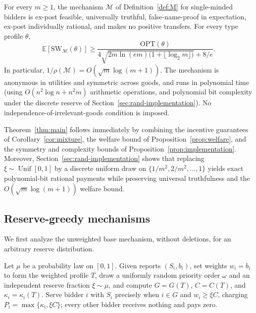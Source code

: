 \documentclass[format=acmsmall, review=false]{acmart}
\newcommand{\E}{\mathbb{E}}
\newcommand{\OPT}{\mathrm{OPT}}
\newcommand{\SW}{\mathrm{SW}}
\theoremstyle{acmdefinition}%
\begin{document}
\begin{theorem}\label{thm:main}
For every \(m\ge1\), the mechanism \(\mathcal M\) of
Definition~\ref{def:M} for single-minded bidders is ex-post
feasible, universally truthful, false-name-proof in expectation,
ex-post individually rational, and makes no positive transfers.
For every type profile \(\theta\),
\[
\E[\SW_{\mathcal M}(\theta)]
\ge
\frac{\OPT(\theta)}{
4\sqrt{2m\ln(em)\bigl(1+\lfloor\log_2m\rfloor\bigr)}+8/e}.
\]
In particular, \(1/\rho(\mathcal M)=O(\sqrt m\log(m+1))\).
The mechanism is anonymous in utilities and symmetric across
goods, and runs in polynomial time (using \(O(n^2\log n+n^2m)\)
arithmetic operations, and polynomial bit complexity under the
discrete reserve of Section~\ref{sec:rand-implementation}). No
independence-of-irrelevant-goods condition is imposed.
\end{theorem}

Theorem~\ref{thm:main} follows immediately by combining the
incentive guarantees of Corollary~\ref{cor:mixture}, the welfare
bound of Proposition~\ref{prop:welfare}, and the symmetry and
complexity bounds of Proposition~\ref{prop:implementation}.
Moreover, Section~\ref{sec:rand-implementation} shows that
replacing \(\xi\sim\operatorname{Unif}[0,1]\) by a discrete
uniform draw on \(\{1/m^2,2/m^2,\ldots,1\}\) yields exact
polynomial-bit rational payments while preserving universal
truthfulness and the \(O(\sqrt m\log(m+1))\) welfare bound.

\subsection{Reserve-greedy mechanisms}
\label{sec:rand-reserve}

We first analyze the unweighted base mechanism, without deletions,
for an arbitrary reserve distribution.

\begin{definition}
\label{def:reserve-greedy}
Let \(\mu\) be a probability law on \([0,1]\). Given reports
\((S_i,b_i)\), set weights \(w_i=b_i\) to form the weighted
profile \(T\), draw a uniformly random priority order \(\omega\)
and an independent reserve fraction \(\xi\sim\mu\), and compute
\(G=G(T)\), \(C=C(T)\), and \(\kappa_i=\kappa_i(T)\). Serve
bidder \(i\) with \(S_i\) precisely when \(i\in G\) and
\(w_i\ge\xi C\), charging \(P_i=\max\{\kappa_i,\xi C\}\); every
other bidder receives nothing and pays zero.
\end{definition}
\end{document}
